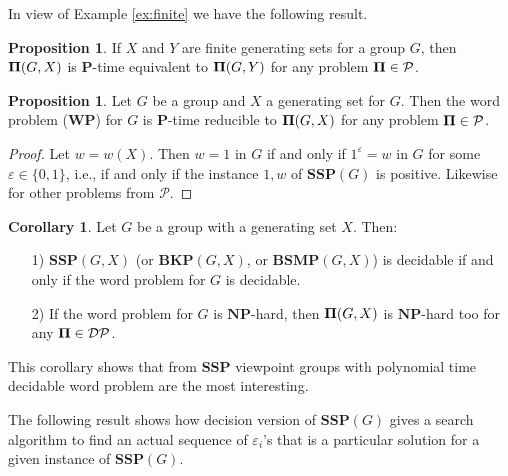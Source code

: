 \documentclass[10pt]{amsart}
\theoremstyle{definition}
\newtheorem{proposition}[theorem]{Proposition}
\newtheorem{corollary}[theorem]{Corollary}
\def\P{{\mathbf{P}}}
\def\NP{{\mathbf{NP}}}
\def\WP{{\mathbf{WP}}}
\def\SSP{{\mathbf{SSP}}}
\def\BSMP{{\mathbf{BSMP}}}
\def\BKP{{\mathbf{BKP}}}
\begin{document}
In view of Example \ref{ex:finite} we have the following result.

\begin{proposition}\label{le:FiniteX_independence}
If $X$ and $Y$ are finite generating sets for a group $G$, then  ${\bf \Pi}(G,X)$ is $\P$-time  equivalent  to ${\bf \Pi}(G,Y)$ for any problem ${\bf \Pi} \in \mathcal{P}$.
\end{proposition}

\begin{proposition}
Let $G$ be a group and $X$ a generating set for $G$.
Then the  word problem ($\WP$) for $G$ is $\P$-time reducible to ${\bf \Pi}(G,X)$ for any problem ${\bf \Pi} \in \mathcal{P}$.
\end{proposition}

\begin{proof}
Let $w=w(X)$.
Then $w=1$ in $G$ if and only if $1^\varepsilon  = w$ in $G$ for some $\varepsilon \in \{0,1\}$, i.e.,
if and only if the instance $1,w$ of $\SSP(G)$ is positive. Likewise for other problems from ${\mathcal P}$.
\end{proof}

\begin{corollary}
Let $G$ be a group with a generating set $X$. Then:

\begin{enumerate}
\item [1)] $\SSP(G,X)$ (or $\BKP(G,X)$, or $\BSMP(G,X)$) is decidable if and only if the word problem
for $G$ is decidable.
\item [2)] If the word problem for $G$ is $\NP$-hard,
then ${\bf \Pi}(G,X)$ is $\NP$-hard too for any ${\bf \Pi} \in \mathcal{DP}$.
\end{enumerate}
\end{corollary}

This corollary shows that from $\SSP$ viewpoint groups with polynomial time decidable word problem are the most interesting.

The following result shows how decision version of $\SSP(G)$ gives a search  algorithm to find an actual sequence of $\varepsilon_i$'s that is a particular solution for a given instance of $\SSP(G)$.
\end{document}
